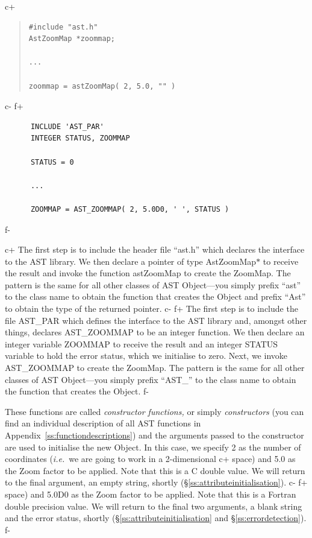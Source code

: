 \documentclass[twoside,11pt]{article}
\newcommand{\appref}[1]{Appendix~\ref{#1}}
\newcommand{\secref}[1]{\S\ref{#1}}
\newcommand{\appref}[1]{\ref{#1}}
\newcommand{\secref}[1]{\ref{#1}}
\begin{document}
c+
\begin{quote}
\small
\begin{verbatim}
#include "ast.h"
AstZoomMap *zoommap;

...

zoommap = astZoomMap( 2, 5.0, "" )
\end{verbatim}
\normalsize
\end{quote}
c-
f+
\small
\begin{verbatim}
      INCLUDE 'AST_PAR'
      INTEGER STATUS, ZOOMMAP

      STATUS = 0

      ...

      ZOOMMAP = AST_ZOOMMAP( 2, 5.0D0, ' ', STATUS )
\end{verbatim}
\normalsize
f-

c+
The first step is to include the header file ``ast.h'' which declares
the interface to the AST library.  We then declare a pointer of type
AstZoomMap$*$ to receive the result and invoke the function astZoomMap
to create the ZoomMap. The pattern is the same for all other classes
of AST Object---you simply prefix ``ast'' to the class name to obtain
the function that creates the Object and prefix ``Ast'' to obtain the
type of the returned pointer.
c-
f+
The first step is to include the file AST\_PAR which defines the
interface to the AST library and, amongst other things, declares
AST\_ZOOMMAP to be an integer function.  We then declare an integer
variable ZOOMMAP to receive the result and an integer STATUS variable
to hold the error status, which we initialise to zero. Next, we invoke
AST\_ZOOMMAP to create the ZoomMap. The pattern is the same for all
other classes of AST Object---you simply prefix ``AST\_'' to the class
name to obtain the function that creates the Object.
f-

These functions are called {\em{constructor functions,}} or simply
{\em{constructors}} (you can find an individual description of all AST
functions in \appref{ss:functiondescriptions}) and the arguments
passed to the constructor are used to initialise the new Object. In
this case, we specify 2 as the number of coordinates ({\em{i.e.}}\ we
are going to work in a 2-dimensional
c+
space) and 5.0 as the Zoom factor to be applied. Note that this is a C
double value. We will return to the final argument, an empty string,
shortly (\secref{ss:attributeinitialisation}).
c-
f+
space) and 5.0D0 as the Zoom factor to be applied. Note that this is a
Fortran double precision value. We will return to the final two
arguments, a blank string and the error status, shortly
(\secref{ss:attributeinitialisation} and \secref{ss:errordetection}).
f-
\end{document}
